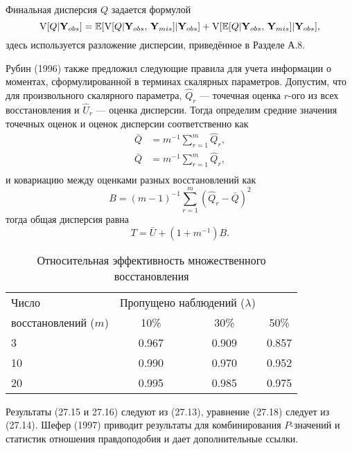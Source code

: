 Финальная дисперсия $Q$ задается формулой
\begin{equation}
\mathrm{V}[Q|\mathbf{Y}_{obs}]=\mathbb{E}[\mathrm{V}[Q|\mathbf{Y}_{obs}, \, \mathbf{Y}_{mis}]|\mathbf{Y}_{obs}]+ \mathrm{V}[\mathbb{E}[Q|\mathbf{Y}_{obs}, \, \mathbf{Y}_{mis}]|\mathbf{Y}_{obs}],
\end{equation}
здесь используется разложение дисперсии, приведённое в Разделе А.8.

Рубин (1996) также предложил следующие правила для учета информации о моментах, сформулированной в терминах скалярных параметров. Допустим, что для произвольного скалярного параметра, $\widehat{Q}_r$ --- точечная оценка $r$-ого из всех восстановления и $\widehat{U}_r$ --- оценка дисперсии. Тогда определим средние значения точечных оценок и оценок дисперсии соответственно как 
\begin{align}
\bar{Q}&=m^{-1} \sum \limits^{m}_{r=1}\widehat{Q}_r, \\
\bar{Q}&=m^{-1} \sum \limits^{m}_{r=1}\widehat{Q}_r, \\
\end{align}
и ковариацию между оценками разных восстановлений как
\begin{equation}
B=(m-1)^{-1} \sum \limits^{m}_{r=1}(\widehat{Q}_r - \bar{Q})^2
\end{equation}
тогда общая дисперсия равна
\begin{equation}
T=\bar{U}+(1+m^{-1})B.
\end{equation}


\begin{table}[h]
\begin{center}
\caption{\label{tab:27.1} Относительная эффективность множественного восстановления}
\begin{tabular}[t]{lccc}
\hline
\hline
Число & \multicolumn{2}{c}{Пропущено наблюдений ($\lambda$)} \\
восстановлений ($m$) & 10\% & 30\% & 50\% \\
\hline
3  &  0.967 & 0.909 & 0.857 \\
10 &  0.990 & 0.970 & 0.952 \\
20 &  0.995 & 0.985 & 0.975 \\
\hline
\hline
\end{tabular}
\end{center}
\end{table}




Результаты (27.15 и 27.16) следуют из (27.13), уравнение (27.18) следует из (27.14). Шефер (1997) приводит результаты для комбинирования $P$-значений и статистик отношения правдоподобия и дает дополнительные ссылки.


